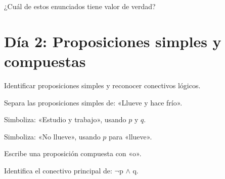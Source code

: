\begin{activity}[id=dia-01-opcion-02,type=choice,weight=1]

¿Cuál de estos enunciados tiene valor de verdad?





\end{activity}

\section{Día 2: Proposiciones simples y compuestas}

\begin{lesson}[id=dia-02-lectura,weight=0]

Identificar proposiciones simples y reconocer conectivos lógicos.

\end{lesson}

\begin{activity}[id=dia-02-corta-01,type=short,weight=1]

Separa las proposiciones simples de: «Llueve y hace frío».

\end{activity}

\begin{activity}[id=dia-02-corta-02,type=short,weight=1]

Simboliza: «Estudio y trabajo», usando \(p\) y \(q\).

\end{activity}

\begin{activity}[id=dia-02-corta-03,type=short,weight=1]

Simboliza: «No llueve», usando \(p\) para «llueve».

\end{activity}

\begin{activity}[id=dia-02-corta-04,type=short,weight=1]

Escribe una proposición compuesta con «o».

\end{activity}

\begin{activity}[id=dia-02-corta-05,type=short,weight=1]

Identifica el conectivo principal de: \(\neg\)p \(\land\) q.

\end{activity}

